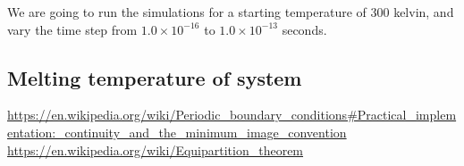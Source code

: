 \documentclass[a4paper]{article}
\begin{document}
We are going to run the simulations for a starting temperature of 300 kelvin,
and vary the time step from $1.0 \times 10^{-16}$ to $1.0 \times 10^{-13}$
seconds.
\subsection{Melting temperature of system}
\label{sub:melting_temperature_of_system}


\listoffigures      

\begin{thebibliography}{9}

    \url{https://en.wikipedia.org/wiki/Periodic_boundary_conditions#Practical_implementation:_continuity_and_the_minimum_image_convention}
    \url{https://en.wikipedia.org/wiki/Equipartition\_theorem}
\end{thebibliography}
\end{document}

